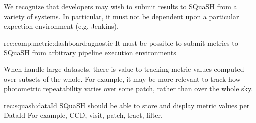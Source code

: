 We recognize that developers may wish to submit results to SQuaSH from a variety of systems.
In particular, it must not be dependent upon a particular expection environment (e.g. Jenkins).

\begin{recommendation}
    {rec:comp:metric:dashboard:agnostic}
    {It must be possible to submit metrics to SQuaSH from arbitrary pipeline execution environments}
\end{recommendation}

When handle large datasets, there is value to tracking metric values computed over subsets of the whole.
For example, it may be more relevant to track how photometric repeatability varies over some patch, rather than over the whole sky.

\begin{recommendation}
    {rec:squash:dataId}
    {SQuaSH should be able to store and display metric values per DataId}
    For example, CCD, visit, patch, tract, filter.
\end{recommendation}
